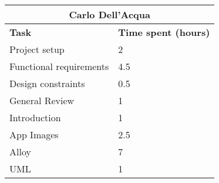 \begin{table}[h]
  \centering
  \begin{tabular}{l|l}
    \multicolumn{2}{c}{\textbf{Carlo Dell'Acqua}} \\
    \hline
    \textbf{Task} & \textbf{Time spent (hours)}\\
    \hline
    Project setup & 2 \\
    Functional requirements & 4.5 \\
    Design constraints & 0.5 \\
    General Review & 1 \\
    Introduction & 1 \\
    App Images & 2.5 \\
    Alloy & 7 \\
    UML & 1 \\
  \end{tabular}
\end{table}